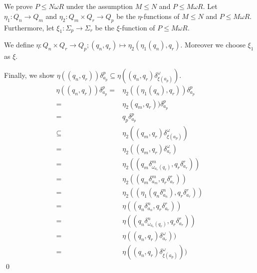 \documentclass[a4paper,12pt,numbers=noenddot]{scrreport}
\begin{document}
\section{}
We prove $P \leq N \omega R$ under the assumption $M \leq N$ and $P \leq M \omega R$.
Let $\eta_1: Q_n \rightarrow Q_m$ and $\eta_2: Q_m \times Q_r \rightarrow Q_p$ be the $\eta$-functions of $M \leq N$ and $P \leq M \omega R$.
Furthermore, let $\xi_1: \Sigma_p \rightarrow \Sigma_r$ be the $\xi$-function of $P \leq M \omega R$.

We define $\eta : Q_n \times Q_r \rightarrow Q_p; (q_n, q_r) \mapsto \eta_2(\eta_1(q_n), q_r)$.
Moreover we choose $\xi_1$ as $\xi$.

Finally, we show $\eta((q_n,q_r))\delta^p_{a_p} \subseteq \eta((q_n, q_r) \delta^\omega_{\xi(a_p)})$.
\begin{align*}
    \eta((q_n,q_r))\delta^p_{a_p} = & \eta_2((\eta_1 (q_n),q_r))\delta^p_{a_p} \tag{def. $\eta, \eta_1$} \\
                      = & \eta_2(q_m,q_r))\delta^p_{a_p} \tag{def. $\eta_2$} \\
                      = & q_p\delta^p_{a_p} \tag{$P \leq M \omega R$} \\
                      \subseteq & \eta_2((q_m, q_r) \delta^\omega_{\xi(a_p)}) \tag{def. $\xi$}\\
                      = & \eta_2((q_m, q_r) \delta^\omega_{a_r}) \tag{def. $\delta^\omega$}\\
                      = & \eta_2((q_m \delta^m_{\omega_{a_r}(q_r)}, q_r \delta^r_{a_r})) \tag{def. $\omega$}\\
                      = & \eta_2((q_m \delta^m_{a_m}, q_r \delta^r_{a_r})) \tag{$M \leq N$}\\
                      = & \eta_2((\eta_1(q_n \delta^n_{a_n}), q_r \delta^r_{a_r})) \tag{def. $\eta$}\\
                      = & \eta((q_n \delta^n_{a_n}, q_r \delta^r_{a_r})) \tag{def. $\omega$}\\
                      = & \eta((q_n \delta^n_{\omega_{a_r}(q_r)}, q_r \delta^r_{a_r})) \tag{def. $\delta^\omega$}\\
                      = & \eta((q_n, q_r) \delta^\omega_{a_r})) \tag{def. $\xi$}\\
                      = & \eta((q_n, q_r) \delta^\omega_{\xi(a_p)}))
\end{align*}
\qed
\section{}
\end{document}
